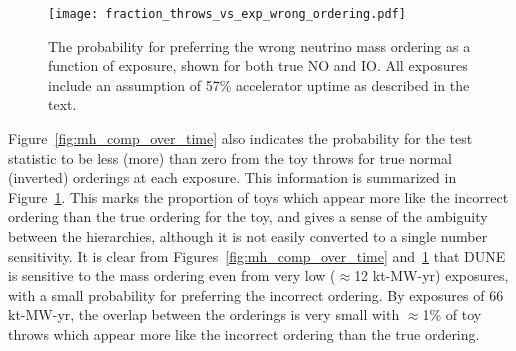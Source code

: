 \begin{figure}[htbp]
  \centering
  \texttt{[image: fraction\_throws\_vs\_exp\_wrong\_ordering.pdf]}
  \caption{The probability for preferring the wrong neutrino mass ordering as a function of exposure, shown for both true NO and IO. All exposures include an assumption of 57\% accelerator uptime as described in the text.}
  \label{fig:mh_wrong}
\end{figure}
Figure~\ref{fig:mh_comp_over_time} also indicates the probability for the test statistic \dchisqMO to be less (more) than zero from the toy throws for true normal (inverted) orderings at each exposure. This information is summarized in Figure~\ref{fig:mh_wrong}. This marks the proportion of toys which appear more like the incorrect ordering than the true ordering for the toy, and gives a sense of the ambiguity between the hierarchies, although it is not easily converted to a single number sensitivity. It is clear from Figures~\ref{fig:mh_comp_over_time} and~\ref{fig:mh_wrong} that DUNE is sensitive to the mass ordering even from very low ($\approx$12 kt-MW-yr) exposures, with a small probability for preferring the incorrect ordering. By exposures of 66 kt-MW-yr, the overlap between the orderings is very small with $\approx$1\% of toy throws which appear more like the incorrect ordering than the true ordering.

\begin{figure*}[htbp]
  \centering
  \\
  \caption{Fraction of throws for which the DUNE sensitivity to the mass ordering exceeds 1--5$\sigma$ significance, as a function of the true value of \deltacp. Shown for NO, for a number of different exposures. The number of throws used to make each figure is also shown. All exposures include an assumption of 57\% accelerator uptime as described in the text.}
  \label{fig:mh_nh_over_time}
\end{figure*}


